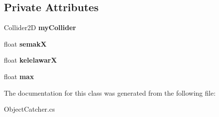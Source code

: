 \subsection*{Private Attributes}
\begin{DoxyCompactItemize}
\item 
\hypertarget{class_object_catcher_a4a29e9cf7fe2bfb94e4f68906a0bfc9f}{}\label{class_object_catcher_a4a29e9cf7fe2bfb94e4f68906a0bfc9f} 
Collider2D {\bfseries my\+Collider}
\item 
\hypertarget{class_object_catcher_a389b6e5fe55fc115800a53065dbd1f3a}{}\label{class_object_catcher_a389b6e5fe55fc115800a53065dbd1f3a} 
float {\bfseries semakX}
\item 
\hypertarget{class_object_catcher_a00601a523ec437d27f6f8e00ac2cbcd6}{}\label{class_object_catcher_a00601a523ec437d27f6f8e00ac2cbcd6} 
float {\bfseries kelelawarX}
\item 
\hypertarget{class_object_catcher_aba4ecde265ae745e7ecf4433ae800151}{}\label{class_object_catcher_aba4ecde265ae745e7ecf4433ae800151} 
float {\bfseries max}
\end{DoxyCompactItemize}


The documentation for this class was generated from the following file\+:\begin{DoxyCompactItemize}
\item 
Object\+Catcher.\+cs\end{DoxyCompactItemize}
